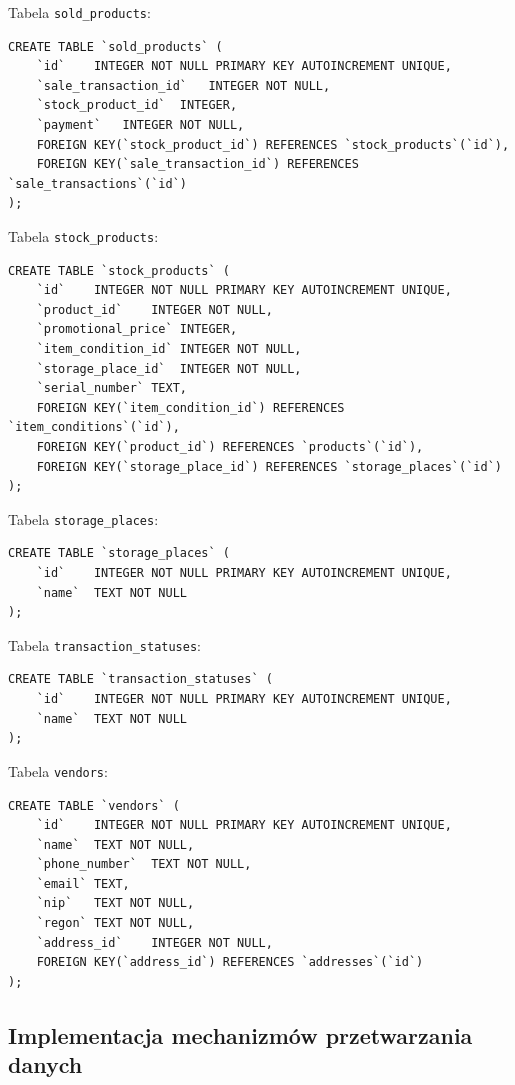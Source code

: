 Tabela \lstinline|sold_products|:

\begin{lstlisting}[style=SQLite]
CREATE TABLE `sold_products` (
	`id`	INTEGER NOT NULL PRIMARY KEY AUTOINCREMENT UNIQUE,
	`sale_transaction_id`	INTEGER NOT NULL,
	`stock_product_id`	INTEGER,
	`payment`	INTEGER NOT NULL,
	FOREIGN KEY(`stock_product_id`) REFERENCES `stock_products`(`id`),
	FOREIGN KEY(`sale_transaction_id`) REFERENCES `sale_transactions`(`id`)
);
\end{lstlisting}

Tabela \lstinline|stock_products|:

\begin{lstlisting}[style=SQLite]
CREATE TABLE `stock_products` (
	`id`	INTEGER NOT NULL PRIMARY KEY AUTOINCREMENT UNIQUE,
	`product_id`	INTEGER NOT NULL,
	`promotional_price`	INTEGER,
	`item_condition_id`	INTEGER NOT NULL,
	`storage_place_id`	INTEGER NOT NULL,
	`serial_number`	TEXT,
	FOREIGN KEY(`item_condition_id`) REFERENCES `item_conditions`(`id`),
	FOREIGN KEY(`product_id`) REFERENCES `products`(`id`),
	FOREIGN KEY(`storage_place_id`) REFERENCES `storage_places`(`id`)
);
\end{lstlisting}

Tabela \lstinline|storage_places|:

\begin{lstlisting}[style=SQLite]
CREATE TABLE `storage_places` (
	`id`	INTEGER NOT NULL PRIMARY KEY AUTOINCREMENT UNIQUE,
	`name`	TEXT NOT NULL
);
\end{lstlisting}

Tabela \lstinline|transaction_statuses|:

\begin{lstlisting}[style=SQLite]
CREATE TABLE `transaction_statuses` (
	`id`	INTEGER NOT NULL PRIMARY KEY AUTOINCREMENT UNIQUE,
	`name`	TEXT NOT NULL
);
\end{lstlisting}

Tabela \lstinline|vendors|:

\begin{lstlisting}[style=SQLite]
CREATE TABLE `vendors` (
	`id`	INTEGER NOT NULL PRIMARY KEY AUTOINCREMENT UNIQUE,
	`name`	TEXT NOT NULL,
	`phone_number`	TEXT NOT NULL,
	`email`	TEXT,
	`nip`	TEXT NOT NULL,
	`regon`	TEXT NOT NULL,
	`address_id`	INTEGER NOT NULL,
	FOREIGN KEY(`address_id`) REFERENCES `addresses`(`id`)
);
\end{lstlisting}

\subsection{Implementacja mechanizmów przetwarzania danych}

